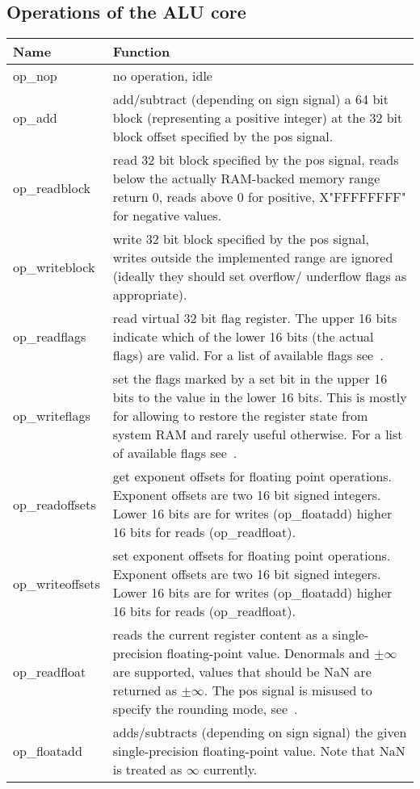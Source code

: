 \subsection{Operations of the ALU core}
\label{sec:aluops}
\renewcommand\tabline[2]{#1 & #2\\ \hline}
\begin{center}
\begin{tabular}{|l|p{}|}
\hline
\tabline {Name}  {Function}
\hline
\tabline {op\_nop} {no operation, idle}
\tabline {op\_add} {
    add/subtract (depending on sign signal) a 64 bit block
    (representing a positive integer) at the 32 bit block offset
    specified by the pos signal.}
\tabline {op\_readblock} {
    read 32 bit block specified by the pos signal, reads
    below the actually RAM-backed memory range return 0,
    reads above 0 for positive, X"FFFFFFFF" for negative values.}
\tabline {op\_writeblock} {
    write 32 bit block specified by the pos signal, writes outside
    the implemented range are ignored (ideally they should set overflow/
    underflow flags as appropriate).}
\tabline {op\_readflags} {
    read virtual 32 bit flag register. The upper 16 bits indicate
    which of the lower 16 bits (the actual flags) are valid.
    For a list of available flags see~\fref{tab:flags}.}
\tabline {op\_writeflags} {
    set the flags marked by a set bit in the upper 16 bits to
    the value in the lower 16 bits.
    This is mostly for allowing to restore the register state from system
    RAM and rarely useful otherwise.
    For a list of available flags see~\fref{tab:flags}.}
\tabline {op\_readoffsets} {
    get exponent offsets for floating point operations.
    Exponent offsets are two 16 bit signed integers.
    Lower 16 bits are for writes (op\_floatadd) higher 16 bits for reads (op\_readfloat).}
\tabline {op\_writeoffsets} {
    set exponent offsets for floating point operations.
    Exponent offsets are two 16 bit signed integers.
    Lower 16 bits are for writes (op\_floatadd) higher 16 bits for reads (op\_readfloat).}
\tabline {op\_readfloat} {
    reads the current register content as a single-precision
    floating-point value. Denormals and $\pm\infty$ are supported, values that should
    be NaN are returned as $\pm\infty$.
    The pos signal is misused to specify the rounding mode, see~\fref{tab:round}.}
\tabline {op\_floatadd} {
    adds/subtracts (depending on sign signal) the given
    single-precision floating-point value. Note that NaN is treated as $\infty$
    currently.}
\end{tabular}
\end{center}

